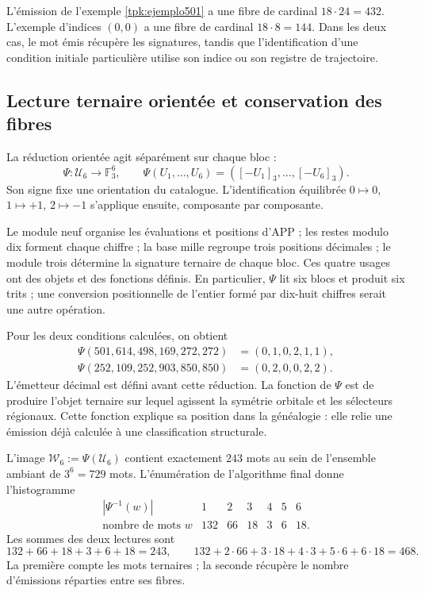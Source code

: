 L'émission de l'exemple \ref{tpk:ejemplo501} a une fibre de cardinal
\(18\cdot24=432\). L'exemple d'indices \((0,0)\) a une fibre de
cardinal \(18\cdot8=144\). Dans les deux cas, le mot émis récupère
les signatures, tandis que l'identification d'une condition initiale particulière
utilise son indice ou son registre de trajectoire.

\subsection{Lecture ternaire orientée et conservation des fibres}
\label{tpk:reduccion-ternaria}

La réduction orientée agit séparément sur chaque bloc :
\begin{equation}
 \Psi:\mathcal U_6\longrightarrow\mathbb F_3^6,\qquad
 \Psi(U_1,\ldots,U_6)=([-U_1]_3,\ldots,[-U_6]_3).
 \label{tpk:psi}
\end{equation}
Son signe fixe une orientation du catalogue. L'identification équilibrée
\(0\mapsto0\), \(1\mapsto+1\), \(2\mapsto-1\) s'applique ensuite,
composante par composante.

Le module neuf organise les évaluations et positions d'APP ; les restes modulo dix forment chaque chiffre ; la base mille regroupe trois positions décimales ; le module trois détermine la signature ternaire de chaque bloc. Ces quatre usages ont des objets et des fonctions définis. En particulier, \(\Psi\) lit six blocs et produit six trits ; une conversion positionnelle de l'entier formé par dix-huit chiffres serait une autre opération.

Pour les deux conditions calculées, on obtient
\begin{align*}
 \Psi(501,614,498,169,272,272)&=(0,1,0,2,1,1),\\
 \Psi(252,109,252,903,850,850)&=(0,2,0,0,2,2).
\end{align*}
L'émetteur décimal est défini avant cette réduction. La fonction de
\(\Psi\) est de produire l'objet ternaire sur lequel agissent la symétrie
orbitale et les sélecteurs régionaux. Cette fonction explique sa position dans la
généalogie : elle relie une émission déjà calculée à une classification structurale.

L'image \(\mathcal W_6:=\Psi(\mathcal U_6)\) contient exactement
\(243\) mots au sein de l'ensemble ambiant de \(3^6=729\) mots.
L'énumération de l'algorithme final donne l'histogramme
\begin{equation}
\begin{array}{c|rrrrrr}
 |\Psi^{-1}(w)|&1&2&3&4&5&6\\\hline
 \text{nombre de mots }w&132&66&18&3&6&18.
\end{array}
\label{tpk:fibras-ternarias}
\end{equation}
Les sommes des deux lectures sont
\[
132+66+18+3+6+18=243,
\qquad132+2\cdot66+3\cdot18+4\cdot3+5\cdot6+6\cdot18=468.
\]
La première compte les mots ternaires ; la seconde récupère le nombre d'émissions réparties entre ses fibres.


